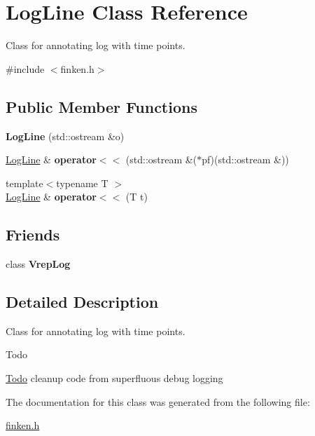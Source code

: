 \hypertarget{classLogLine}{}\section{Log\+Line Class Reference}
\label{classLogLine}


Class for annotating log with time points.  




{\ttfamily \#include $<$finken.\+h$>$}

\subsection*{Public Member Functions}
\begin{DoxyCompactItemize}
\item 
{\bfseries Log\+Line} (std\+::ostream \&o)\hypertarget{classLogLine_a7f1c876fef642fffb06f646749662a04}{}\label{classLogLine_a7f1c876fef642fffb06f646749662a04}

\item 
\hyperlink{classLogLine}{Log\+Line} \& {\bfseries operator$<$$<$} (std\+::ostream \&($\ast$pf)(std\+::ostream \&))\hypertarget{classLogLine_a9697d8126ee9dd2ee3ea70bc61abf4b8}{}\label{classLogLine_a9697d8126ee9dd2ee3ea70bc61abf4b8}

\item 
{\footnotesize template$<$typename T $>$ }\\\hyperlink{classLogLine}{Log\+Line} \& {\bfseries operator$<$$<$} (T t)\hypertarget{classLogLine_aa9dff12f0c1466e53e63f981872f1e76}{}\label{classLogLine_aa9dff12f0c1466e53e63f981872f1e76}

\end{DoxyCompactItemize}
\subsection*{Friends}
\begin{DoxyCompactItemize}
\item 
class {\bfseries Vrep\+Log}\hypertarget{classLogLine_a4b85b5c9be56c4b49e99130f36f2df1d}{}\label{classLogLine_a4b85b5c9be56c4b49e99130f36f2df1d}

\end{DoxyCompactItemize}


\subsection{Detailed Description}
Class for annotating log with time points. 

\begin{DoxyRefDesc}{Todo}
\item[\hyperlink{todo__todo000003}{Todo}]cleanup code from superfluous debug logging \end{DoxyRefDesc}


The documentation for this class was generated from the following file\+:\begin{DoxyCompactItemize}
\item 
\hyperlink{finken_8h}{finken.\+h}\end{DoxyCompactItemize}
